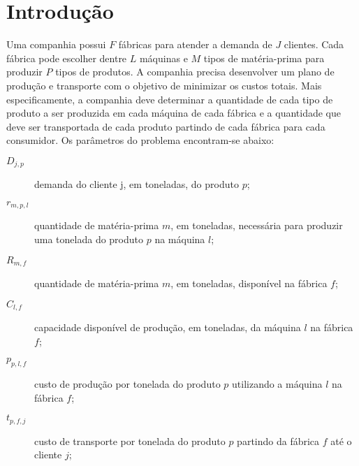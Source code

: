 \section{Introdução} \label{sec:introducao}

    Uma companhia possui $F$ fábricas para atender a demanda de $J$ clientes. Cada fábrica pode escolher dentre $L$ máquinas e $M$ tipos de matéria-prima para produzir $P$ tipos de produtos. A companhia precisa desenvolver um plano de produção e transporte com o objetivo de minimizar os custos totais. Mais especificamente, a companhia deve determinar a quantidade de cada tipo de produto a ser produzida em cada máquina de cada fábrica e a quantidade que deve ser transportada de cada produto partindo de cada fábrica para cada consumidor. Os parâmetros do problema encontram-se abaixo:

    \begin{description}
        \item[$D_{j,p}$]   demanda do cliente j, em toneladas, do produto $p$;
        \item[$r_{m,p,l}$] quantidade de matéria-prima $m$, em toneladas, necessária para produzir uma tonelada do produto $p$ na máquina $l$;
        \item[$R_{m,f}$]   quantidade de matéria-prima $m$, em toneladas, disponível na fábrica $f$;
        \item[$C_{l,f}$]   capacidade disponível de produção, em toneladas, da máquina $l$ na fábrica $f$;
        \item[$p_{p,l,f}$] custo de produção por tonelada do produto $p$ utilizando a máquina $l$ na fábrica $f$;
        \item[$t_{p,f,j}$] custo de transporte por tonelada do produto $p$ partindo da fábrica $f$ até o cliente $j$;
    \end{description}
